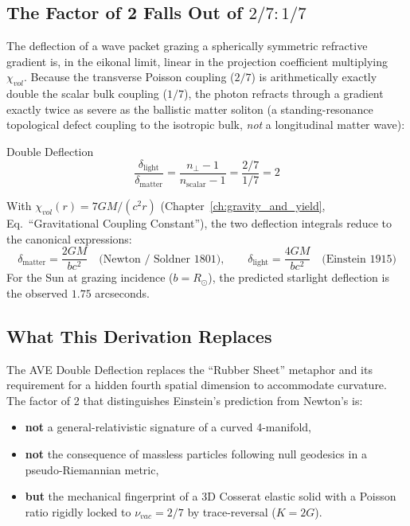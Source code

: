 \subsection{The Factor of 2 Falls Out of $2/7 : 1/7$}

The deflection of a wave packet grazing a spherically symmetric refractive gradient is, in the eikonal limit, linear in the projection coefficient multiplying $\chi_{vol}$. Because the transverse Poisson coupling ($2/7$) is arithmetically exactly double the scalar bulk coupling ($1/7$), the photon refracts through a gradient exactly twice as severe as the ballistic matter soliton (a standing-resonance topological defect coupling to the isotropic bulk, \emph{not} a longitudinal matter wave):
\begin{resultbox}{Double Deflection}
\begin{equation}
    \frac{\delta_{\text{light}}}{\delta_{\text{matter}}} = \frac{n_{\perp} - 1}{n_{\text{scalar}} - 1} = \frac{2/7}{1/7} = 2
\end{equation}
\end{resultbox}

With $\chi_{vol}(r) = 7GM/(c^2 r)$ (Chapter~\ref{ch:gravity_and_yield}, Eq.~``Gravitational Coupling Constant''), the two deflection integrals reduce to the canonical expressions:
\begin{equation}
    \delta_{\text{matter}} = \frac{2GM}{bc^2} \quad\text{(Newton / Soldner 1801)},
    \qquad
    \delta_{\text{light}} = \frac{4GM}{bc^2} \quad\text{(Einstein 1915)}
\end{equation}
For the Sun at grazing incidence ($b = R_\odot$), the predicted starlight deflection is the observed $1.75$ arcseconds.

\subsection{What This Derivation Replaces}

The AVE Double Deflection replaces the ``Rubber Sheet'' metaphor and its requirement for a hidden fourth spatial dimension to accommodate curvature. The factor of 2 that distinguishes Einstein's prediction from Newton's is:

\begin{itemize}
    \item \textbf{not} a general-relativistic signature of a curved 4-manifold,
    \item \textbf{not} the consequence of massless particles following null geodesics in a pseudo-Riemannian metric,
    \item \textbf{but} the mechanical fingerprint of a 3D Cosserat elastic solid with a Poisson ratio rigidly locked to $\nu_{vac} = 2/7$ by trace-reversal ($K = 2G$).
\end{itemize}

